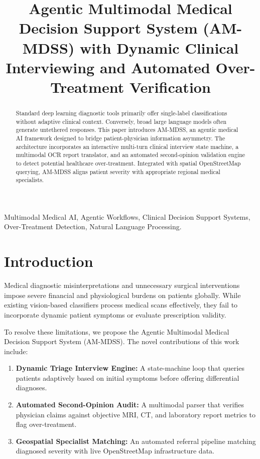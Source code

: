 \documentclass[conference]{IEEEtran}
\begin{document}
\title{Agentic Multimodal Medical Decision Support System (AM-MDSS) with Dynamic Clinical Interviewing and Automated Over-Treatment Verification}

\author{
}

\maketitle

\begin{abstract}
Standard deep learning diagnostic tools primarily offer single-label classifications without adaptive clinical context. Conversely, broad large language models often generate untethered responses. This paper introduces AM-MDSS, an agentic medical AI framework designed to bridge patient-physician information asymmetry. The architecture incorporates an interactive multi-turn clinical interview state machine, a multimodal OCR report translator, and an automated second-opinion validation engine to detect potential healthcare over-treatment. Integrated with spatial OpenStreetMap querying, AM-MDSS aligns patient severity with appropriate regional medical specialists.
\end{abstract}

\begin{IEEEkeywords}
Multimodal Medical AI, Agentic Workflows, Clinical Decision Support Systems, Over-Treatment Detection, Natural Language Processing.
\end{IEEEkeywords}

\section{Introduction}
Medical diagnostic misinterpretations and unnecessary surgical interventions impose severe financial and physiological burdens on patients globally. While existing vision-based classifiers process medical scans effectively, they fail to incorporate dynamic patient symptoms or evaluate prescription validity. 

To resolve these limitations, we propose the Agentic Multimodal Medical Decision Support System (AM-MDSS). The novel contributions of this work include:
\begin{enumerate}
    \item \textbf{Dynamic Triage Interview Engine:} A state-machine loop that queries patients adaptively based on initial symptoms before offering differential diagnoses.
    \item \textbf{Automated Second-Opinion Audit:} A multimodal parser that verifies physician claims against objective MRI, CT, and laboratory report metrics to flag over-treatment.
    \item \textbf{Geospatial Specialist Matching:} An automated referral pipeline matching diagnosed severity with live OpenStreetMap infrastructure data.
\end{enumerate}
\end{document}
